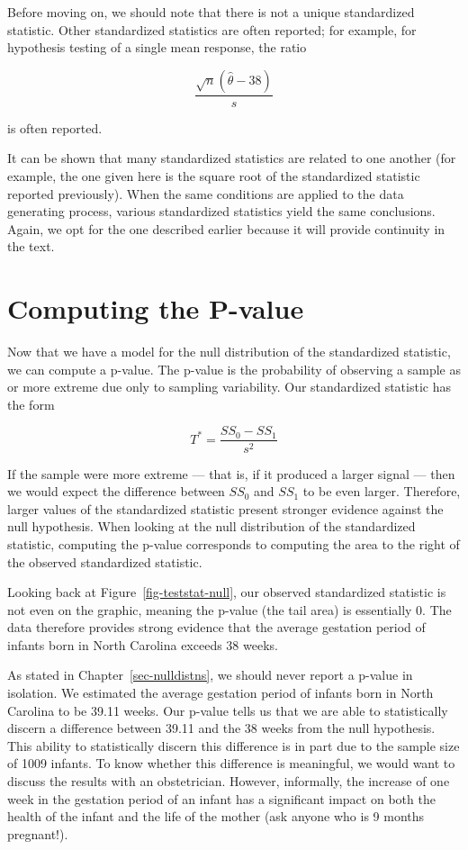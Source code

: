 \documentclass[
  letterpaper,
  DIV=11,
  numbers=noendperiod]{scrreprt}
\theoremstyle{definition}
\theoremstyle{definition}
\theoremstyle{plain}
\theoremstyle{remark}
\begin{document}
Before moving on, we should note that there is not a unique standardized
statistic. Other standardized statistics are often reported; for
example, for hypothesis testing of a single mean response, the ratio

\[\frac{\sqrt{n}\left(\widehat{\theta} - 38\right)}{s}\]

is often reported.

It can be shown that many standardized statistics are related to one
another (for example, the one given here is the square root of the
standardized statistic reported previously). When the same conditions
are applied to the data generating process, various standardized
statistics yield the same conclusions. Again, we opt for the one
described earlier because it will provide continuity in the text.

\hypertarget{computing-the-p-value}{%
\section{Computing the P-value}\label{computing-the-p-value}}

Now that we have a model for the null distribution of the standardized
statistic, we can compute a p-value. The p-value is the probability of
observing a sample as or more extreme due only to sampling variability.
Our standardized statistic has the form

\[T^* = \frac{SS_0 - SS_1}{s^2}\]

If the sample were more extreme --- that is, if it produced a larger
signal --- then we would expect the difference between \(SS_0\) and
\(SS_1\) to be even larger. Therefore, larger values of the standardized
statistic present stronger evidence against the null hypothesis. When
looking at the null distribution of the standardized statistic,
computing the p-value corresponds to computing the area to the right of
the observed standardized statistic.

Looking back at Figure~\ref{fig-teststat-null}, our observed
standardized statistic is not even on the graphic, meaning the p-value
(the tail area) is essentially 0. The data therefore provides strong
evidence that the average gestation period of infants born in North
Carolina exceeds 38 weeks.

As stated in Chapter~\ref{sec-nulldistns}, we should never report a
p-value in isolation. We estimated the average gestation period of
infants born in North Carolina to be 39.11 weeks. Our p-value tells us
that we are able to statistically discern a difference between 39.11 and
the 38 weeks from the null hypothesis. This ability to statistically
discern this difference is in part due to the sample size of 1009
infants. To know whether this difference is meaningful, we would want to
discuss the results with an obstetrician. However, informally, the
increase of one week in the gestation period of an infant has a
significant impact on both the health of the infant and the life of the
mother (ask anyone who is 9 months pregnant!).
\end{document}
